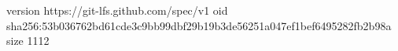 version https://git-lfs.github.com/spec/v1
oid sha256:53b036762bd61cde3c9bb99dbf29b19b3de56251a047ef1bef6495282fb2b98a
size 1112
